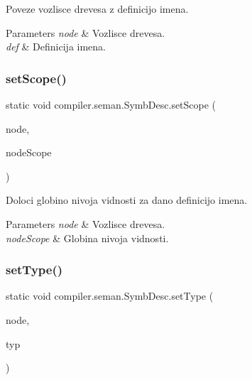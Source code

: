 Poveze vozlisce drevesa z definicijo imena.


\begin{DoxyParams}{Parameters}
{\em node} & Vozlisce drevesa. \\
\hline
{\em def} & Definicija imena. \\
\hline
\end{DoxyParams}
\mbox{\label{classcompiler_1_1seman_1_1_symb_desc_a76d9405731181538c620c3bd1e7e1c62}} 
\subsubsection{\texorpdfstring{set\+Scope()}{setScope()}}
{\footnotesize\ttfamily static void compiler.\+seman.\+Symb\+Desc.\+set\+Scope (\begin{DoxyParamCaption}\item[{\hyperlink{classcompiler_1_1abstr_1_1tree_1_1_abs_tree}{Abs\+Tree}}]{node,  }\item[{int}]{node\+Scope }\end{DoxyParamCaption})\hspace{0.3cm}{\ttfamily [static]}}

Doloci globino nivoja vidnosti za dano definicijo imena.


\begin{DoxyParams}{Parameters}
{\em node} & Vozlisce drevesa. \\
\hline
{\em node\+Scope} & Globina nivoja vidnosti. \\
\hline
\end{DoxyParams}
\mbox{\label{classcompiler_1_1seman_1_1_symb_desc_aba233cf3b5e66207203bfc7d42b8ae4b}} 
\subsubsection{\texorpdfstring{set\+Type()}{setType()}}
{\footnotesize\ttfamily static void compiler.\+seman.\+Symb\+Desc.\+set\+Type (\begin{DoxyParamCaption}\item[{\hyperlink{classcompiler_1_1abstr_1_1tree_1_1_abs_tree}{Abs\+Tree}}]{node,  }\item[{\hyperlink{classcompiler_1_1seman_1_1type_1_1_type}{Type}}]{typ }\end{DoxyParamCaption})\hspace{0.3cm}{\ttfamily [static]}}

